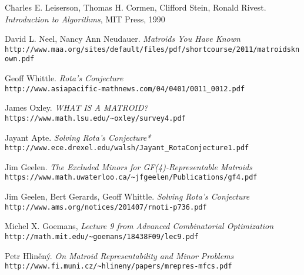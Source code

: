 
\begin{thebibliography}{12}

Charles E. Leiserson, Thomas H. Cormen, Clifford Stein, Ronald Rivest.
\textit{Introduction to Algorithms}, MIT Press, 1990

David L. Neel, Nancy Ann Neudauer. \textit{Matroids You Have Known}\\
\texttt{http://www.maa.org/sites/default/files/pdf/shortcourse/2011/matroidsknown.pdf}

Geoff Whittle. \textit{Rota's Conjecture}\\
\texttt{http://www.asiapacific-mathnews.com/04/0401/0011\_0012.pdf}

James Oxley. \textit{WHAT IS A MATROID?}\\
\texttt{https://www.math.lsu.edu/\~{}oxley/survey4.pdf}

Jayant Apte. \textit{Solving Rota's Conjecture*}\\ 
\texttt{http://www.ece.drexel.edu/walsh/Jayant\_RotaConjecture1.pdf}

Jim Geelen. \textit{The Excluded Minors for GF(4)-Representable Matroids}\\
\texttt{https://www.math.uwaterloo.ca/\~{}jfgeelen/Publications/gf4.pdf}

Jim Geelen, Bert Gerards, Geoff Whittle. \textit{Solving Rota's Conjecture}\\
\texttt{http://www.ams.org/notices/201407/rnoti-p736.pdf}

Michel X. Goemans, \textit{Lecture 9 from Advanced Combinatorial Optimization}\\
\texttt{http://math.mit.edu/\~{}goemans/18438F09/lec9.pdf}

Petr Hlin\v{e}n\'{y}. \textit{On Matroid Representability and Minor Problems}\\
\texttt{http://www.fi.muni.cz/\~{}hlineny/papers/mrepres-mfcs.pdf}


\end{thebibliography}
